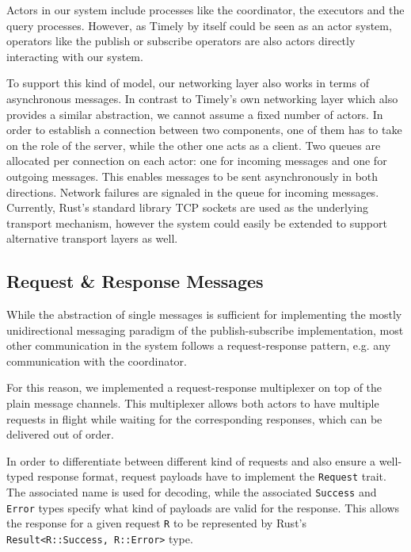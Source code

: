 
Actors in our system include processes like the coordinator, the executors 
and the query processes. However, as Timely by itself could be seen as an
actor system, operators like the publish or subscribe operators are also actors
directly interacting with our system.

To support this kind of model, our networking layer also works in terms of
asynchronous messages. In contrast to Timely's own networking layer which also
provides a similar abstraction, we cannot assume a fixed number of actors.
In order to establish a connection between two components, one of them has to
take on the role of the server, while the other one acts as a client. Two
queues are allocated per connection on each actor: one for incoming messages
and one for outgoing messages. This enables messages to be sent asynchronously
in both directions. Network failures are signaled in the queue for incoming
messages. Currently, Rust's standard library TCP sockets are used as the
underlying transport mechanism, however the system could easily be extended to
support alternative transport layers as well.

\subsection{Request \& Response Messages} \label{sec:reqresp}

While the abstraction of single messages is sufficient for implementing the
mostly unidirectional messaging paradigm of the publish-subscribe implementation,
most other communication in the system follows a request-response pattern,
e.g. any communication with the coordinator.

For this reason, we implemented a request-response multiplexer on
top of the plain message channels. This multiplexer allows both actors to have
multiple requests in flight while waiting for the corresponding responses,
which can be delivered out of order.

In order to differentiate between different kind of requests and also ensure a
well-typed response format, request payloads have to implement the \lstinline{Request}
trait. The associated name is used for decoding, while the associated \lstinline{Success}
and \lstinline{Error} types specify what kind of payloads are valid for the response.
This allows the response for a given request \lstinline{R} to be represented by
Rust's \lstinline{Result<R::Success, R::Error>} type.

